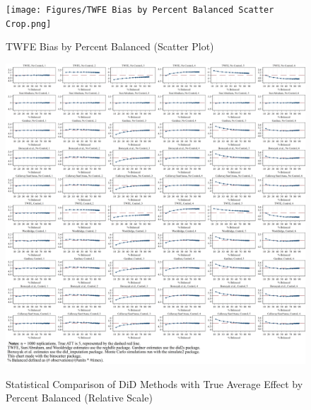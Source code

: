 \documentclass[12pt]{article}
\begin{document}
\begin{figure}
    \centering
    \caption{TWFE Bias by Percent Balanced (Scatter Plot)}
    \texttt{[image: Figures/TWFE Bias by Percent Balanced Scatter Crop.png]}
    \label{fig:scatter-balance}
\end{figure}

\begin{figure}
    \centering
    \caption{Statistical Comparison of DiD Methods with True Average Effect by Percent Balanced (Relative Scale)}
    \includegraphics[width=6in]{Figures/Binscatters by Percent Balanced Relative Scale.png}
    \label{fig:bins-relative}
\end{figure}
\end{document}
